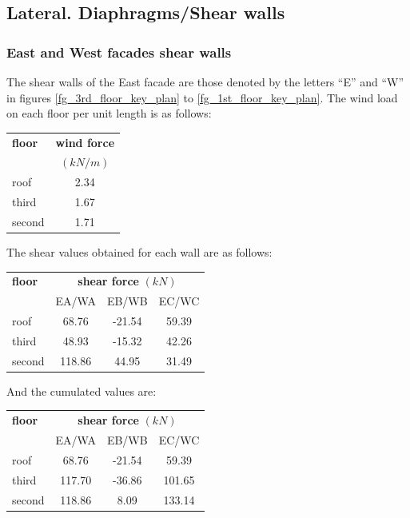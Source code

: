 \subsection{Lateral. Diaphragms/Shear walls}

\subsubsection{East and West facades shear walls}
The shear walls of the East facade are those denoted by the letters ``E'' and ``W'' in figures \ref{fg_3rd_floor_key_plan} to \ref{fg_1st_floor_key_plan}. The wind load on each floor per unit length is as follows:

\begin{center}
  \begin{tabular}{|l|c|}
    \hline
    \textbf{floor} & \textbf{wind force}\\
    & $(kN/m)$\\
    \hline
    roof & 2.34 \\
    third & 1.67 \\
    second & 1.71 \\
    \hline
  \end{tabular}
\end{center}  

\noindent The shear values obtained for each wall are as follows:

\begin{center}
  \begin{tabular}{|l|c|c|c|}
    \hline
    \textbf{floor} & \multicolumn{3}{|c|}{\textbf{shear force} $(kN)$}\\
                   & EA/WA & EB/WB & EC/WC \\
    \hline
    roof & 68.76 & -21.54 & 59.39 \\
    third & 48.93 & -15.32 & 42.26 \\
    second & 118.86 & 44.95 & 31.49 \\
    \hline
  \end{tabular}
\end{center}  

\noindent And the cumulated values are:

\begin{center}
  \begin{tabular}{|l|c|c|c|}
    \hline
    \textbf{floor} & \multicolumn{3}{|c|}{\textbf{shear force} $(kN)$}\\
                   & EA/WA & EB/WB & EC/WC \\
    \hline
    roof & 68.76 & -21.54 & 59.39 \\
    third & 117.70 & -36.86 & 101.65 \\
    second & 118.86 & 8.09 & 133.14 \\
    \hline
  \end{tabular}
\end{center}

